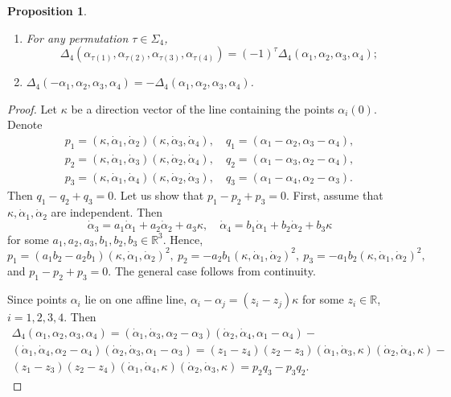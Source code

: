 \documentclass{article}
\newtheorem{proposition}{Proposition}
\theoremstyle{definition}
\theoremstyle{remark}
\def\R{{\mathbb R}}
\begin{document}
\begin{proposition}\label{prop:4secant_delta}
\begin{enumerate}
    \item For any permutation $\tau\in\Sigma_4$,
\[
\Delta_4(\alpha_{\tau(1)},\alpha_{\tau(2)},\alpha_{\tau(3)},\alpha_{\tau(4)})=(-1)^\tau\Delta_4(\alpha_1,\alpha_2,\alpha_3,\alpha_4);
\]
    \item $\Delta_4(-\alpha_1,\alpha_2,\alpha_3,\alpha_4)=-\Delta_4(\alpha_1,\alpha_2,\alpha_3,\alpha_4)$.
\end{enumerate}
\end{proposition}
\begin{proof}
    Let $\kappa$ be a direction vector of the line containing the points $\alpha_i(0)$. Denote
\begin{gather*}
    p_1=(\kappa,\dot\alpha_1,\dot\alpha_2)(\kappa,\dot\alpha_3,\dot\alpha_4),\quad q_1=(\alpha_1-\alpha_2,\alpha_3-\alpha_4),\\
    p_2=(\kappa,\dot\alpha_1,\dot\alpha_3)(\kappa,\dot\alpha_2,\dot\alpha_4),\quad q_2=(\alpha_1-\alpha_3,\alpha_2-\alpha_4),\\
    p_3=(\kappa,\dot\alpha_1,\dot\alpha_4)(\kappa,\dot\alpha_2,\dot\alpha_3),\quad q_3=(\alpha_1-\alpha_4,\alpha_2-\alpha_3).
\end{gather*}
Then $q_1-q_2+q_3=0$. Let us show that $p_1-p_2+p_3=0$.
%
First, assume that $\kappa,\dot\alpha_1, \dot\alpha_2$ are independent. Then
\[
\dot\alpha_3=a_1\dot\alpha_1+a_2\dot\alpha_2+a_3\kappa,\quad
\dot\alpha_4=b_1\dot\alpha_1+b_2\dot\alpha_2+b_3\kappa
\]
for some $a_1,a_2,a_3,b_1,b_2,b_3\in\R^3$. Hence,
\[
p_1=(a_1b_2-a_2b_1)(\kappa,\dot\alpha_1,\dot\alpha_2)^2,\
p_2=-a_2b_1(\kappa,\dot\alpha_1,\dot\alpha_2)^2,\
p_3=-a_1b_2(\kappa,\dot\alpha_1,\dot\alpha_2)^2,
\]
and $p_1-p_2+p_3=0$. The general case follows from continuity.

Since points $\alpha_i$ lie on one affine line, $\alpha_i-\alpha_j=(z_i-z_j)\kappa$ for some $z_i\in\R$, $i=1,2,3,4$. Then
\begin{multline*}
\Delta_4(\alpha_1,\alpha_2,\alpha_3,\alpha_4)=(\dot\alpha_1,\dot\alpha_3,\alpha_2-\alpha_3)(\dot\alpha_2,\dot\alpha_4,\alpha_1-\alpha_4)-\\(\dot\alpha_1,\dot\alpha_4,\alpha_2-\alpha_4)(\dot\alpha_2,\dot\alpha_3,\alpha_1-\alpha_3)= (z_1-z_4)(z_2-z_3)(\dot\alpha_1,\dot\alpha_3,\kappa)(\dot\alpha_2,\dot\alpha_4,\kappa)-\\ (z_1-z_3)(z_2-z_4)(\dot\alpha_1,\dot\alpha_4,\kappa)(\dot\alpha_2,\dot\alpha_3,\kappa)=p_2q_3-p_3q_2.
\end{multline*}


\end{proof}
\end{document}
